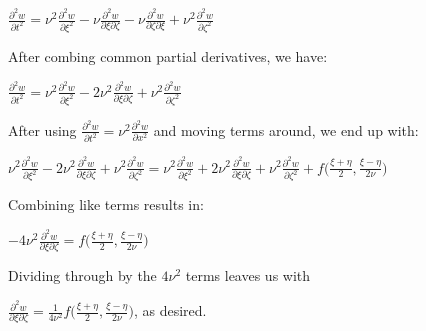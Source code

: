 \documentclass[executivepaper]{article}
\begin{document}
\begin{flushleft}
\begin{center}
$\frac{\partial^2 w}{\partial t^2}=\nu^2  \frac{\partial^2 w }{\partial \xi^2} -\nu \frac{\partial^2 w}{\partial \xi \partial \zeta} - \nu \frac{\partial ^2 w}{\partial \zeta \partial \xi} + \nu^2 \frac{\partial^2 w}{\partial \zeta^2}$

\vspace{3mm}

After combing common partial derivatives, we have:

\vspace{3mm}

$\frac{\partial^2 w}{\partial t^2}=\nu^2 \frac{\partial^2 w }{\partial \xi^2} -2\nu^2 \frac{\partial^2 w}{\partial \xi \partial \zeta} + \nu^2 \frac{\partial^2 w}{\partial \zeta^2}$

\vspace{3mm}

After using $\frac{\partial^2 w}{\partial t^2}=\nu^2\frac{\partial^2 w}{\partial x^2}$ and moving terms around, we end up with:

\vspace{3mm}

$\nu^2 \frac{\partial^2 w }{\partial \xi^2} -2\nu^2 \frac{\partial^2 w}{\partial \xi \partial \zeta} + \nu^2 \frac{\partial^2 w}{\partial \zeta^2}=\nu^2 \frac{\partial^2 w }{\partial \xi^2} +2\nu^2 \frac{\partial^2 w}{\partial \xi \partial \zeta} + \nu^2 \frac{\partial^2 w}{\partial \zeta^2}+f\bigg(\frac{\xi+\eta}{2}, \frac{\xi-\eta}{2\nu}\bigg)$

\vspace{3mm}

Combining like terms results in:

\vspace{3mm}

$-4\nu^2 \frac{\partial^2 w}{\partial \xi \partial \zeta}=f\bigg(\frac{\xi+\eta}{2}, \frac{\xi-\eta}{2\nu}\bigg)$

\vspace{3mm}

Dividing through by the $4\nu^2$ terms leaves us with

\vspace{3mm}

$\frac{\partial^2 w}{\partial \xi \partial \zeta}=\frac{1}{4\nu^2}f\bigg(\frac{\xi+\eta}{2}, \frac{\xi-\eta}{2\nu}\bigg)$, as desired.

\end{center}

\end{flushleft}
\end{document}
